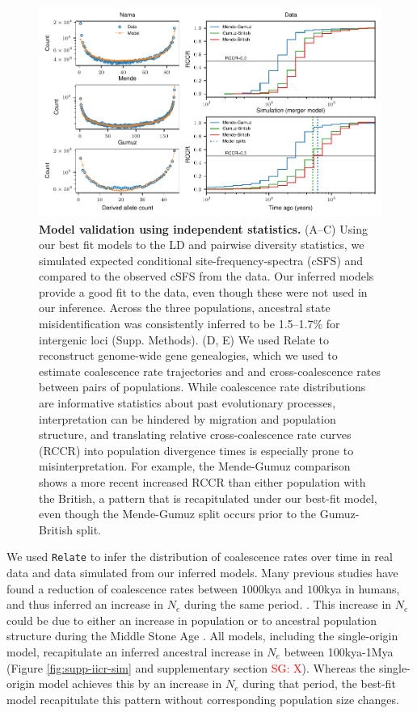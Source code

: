 \documentclass[]{article}
\newcommand{\sgcomment}[1]{{\textcolor{red}{SG: #1}}}
\begin{document}
\begin{figure}[t!]
    \centering
    \includegraphics{figures/fig4}
    \caption{
        \textbf{Model validation using independent statistics.} (A--C) Using
        our best fit models to the LD and pairwise diversity statistics, we
        simulated expected conditional site-frequency-spectra (cSFS) and
        compared to the observed cSFS from the data. Our inferred models
        provide a good fit to the data, even though these were not used in our
        inference. Across the three populations, ancestral state
        misidentification was consistently inferred to be 1.5--1.7\% for
        intergenic loci (Supp. Methods). (D, E) We used Relate
        \citep{Speidel2019-nj} to reconstruct genome-wide gene genealogies,
        which we used to estimate coalescence rate trajectories and
        and cross-coalescence rates between pairs of populations. While
        coalescence rate distributions are informative statistics about past
        evolutionary processes, interpretation can be hindered by migration and
        population structure, and translating relative cross-coalescence rate
        curves (RCCR) into population divergence times is especially prone
        to misinterpretation. For example, the Mende-Gumuz comparison shows
        a more recent increased RCCR than either population with the British,
        a pattern that is recapitulated under our best-fit model, even though
        the Mende-Gumuz split occurs prior to the Gumuz-British split.
    }
    \label{fig:4}
\end{figure}

We used \texttt{Relate} \citep{Speidel2019-nj} to infer the distribution of
coalescence rates over time in real data and data simulated from our inferred models. Many 
previous studies have found a reduction of coalescence rates 
between $1000$kya and $100$kya in humans, and thus inferred an increase 
in $N_e$ during the same period. \citep{Li, Durbin}. 
This increase in $N_e$ could be due to either an increase in population or to 
ancestral population structure during the Middle Stone Age \citep{Mazet2016-wn}.
All models, including the
single-origin model, recapitulate an inferred ancestral
increase in $N_e$ between 100kya-1Mya (Figure \ref{fig:supp-iicr-sim} and supplementary section \sgcomment{X}). Whereas the single-origin model achieves this by
an increase in $N_e$ during that period, the best-fit model recapitulate this pattern without corresponding population size changes.      
\end{document}
